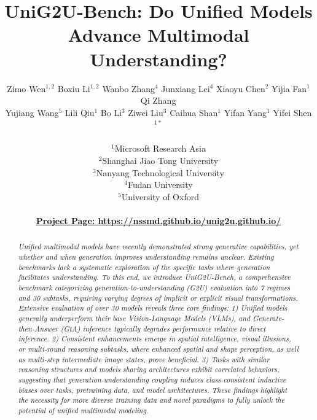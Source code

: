 \documentclass{article}
\title{UniG2U-Bench: Do Unified Models Advance Multimodal Understanding?}
\author{
\begin{tabular}{c}
Zimo Wen$^{1,2}$ 
Boxiu Li$^{1,2}$ 
Wanbo Zhang$^{4}$ 
Junxiang Lei$^{4}$ 
Xiaoyu Chen$^{2}$ 
Yijia Fan$^{1}$ 
Qi Zhang$^{}$ \\
Yujiang Wang$^{5}$ 
Lili Qiu$^{1}$ 
Bo Li$^{3}$ 
Ziwei Liu$^{3}$ 
Caihua Shan$^{1}$
Yifan Yang$^{1}$ 
Yifei Shen$^{1*}$ \\
\\
$^{1}$Microsoft Research Asia \\
$^{2}$Shanghai Jiao Tong University \\
$^{3}$Nanyang Technological University \\
$^{4}$Fudan University \\
$^{5}$University of Oxford \\
\\
\large
\href{https://nssmd.github.io/unig2u.github.io/}
{\textbf{Project Page: https://nssmd.github.io/unig2u.github.io/}}
\end{tabular}
}
\theoremstyle{plain}
\theoremstyle{definition}
\theoremstyle{remark}
\begin{document}
\maketitle


\begin{abstract}
\textit{Unified multimodal models have recently demonstrated strong generative capabilities, yet whether and when generation improves understanding remains unclear. Existing benchmarks lack a systematic exploration of the specific tasks where generation facilitates understanding. To this end, we introduce UniG2U-Bench, a comprehensive benchmark categorizing generation-to-understanding (G2U) evaluation into 7 regimes and 30 subtasks, requiring varying degrees of implicit or explicit visual transformations. Extensive evaluation of over 30 models reveals three core findings:
1) Unified models generally underperform their base Vision-Language Models (VLMs), and Generate-then-Answer (GtA) inference typically degrades performance relative to direct inference.
2) Consistent enhancements emerge in spatial intelligence, visual illusions, or multi-round reasoning subtasks, where enhanced spatial and shape perception, as well as multi-step intermediate image states, prove beneficial.
3) Tasks with similar reasoning structures and models sharing architectures exhibit correlated behaviors, suggesting that generation-understanding coupling induces class-consistent inductive biases over tasks, pretraining data, and model architectures.
These findings highlight the necessity for more diverse training data and novel paradigms to fully unlock the potential of unified multimodal modeling.}
\end{abstract}




\end{document}
